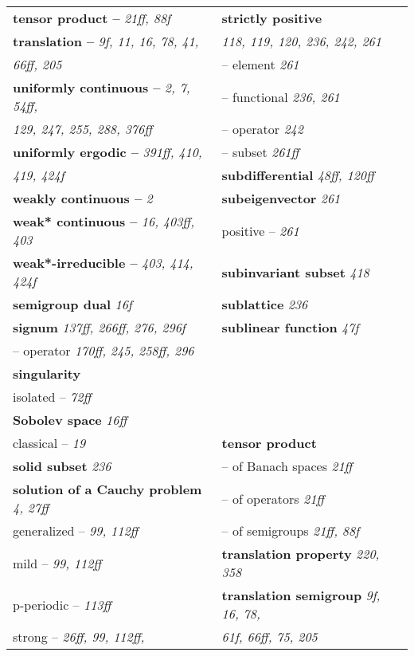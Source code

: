 \begin{longtable}{p{}p{}}
\textbf{tensor product --} \textit{21ff, 88f} & \textbf{strictly positive} \\
\textbf{translation --} \textit{9f, 11, 16, 78, 41,} & \quad \textit{118, 119, 120, 236, 242, 261} \\
\quad \textit{66ff, 205} & \quad -- element \textit{261} \\
\textbf{uniformly continuous --} \textit{2, 7, 54ff,} & \quad -- functional \textit{236, 261} \\
\quad \textit{129, 247, 255, 288, 376ff} & \quad -- operator \textit{242} \\
\textbf{uniformly ergodic --} \textit{391ff, 410,} & \quad -- subset \textit{261ff} \\
\quad \textit{419, 424f} & \textbf{subdifferential} \textit{48ff, 120ff} \\
\textbf{weakly continuous --} \textit{2} & \textbf{subeigenvector} \textit{261} \\
\textbf{weak* continuous --} \textit{16, 403ff, 403} & \quad positive -- \textit{261} \\
\textbf{weak*-irreducible --} \textit{403, 414, 424f} & \textbf{subinvariant subset} \textit{418} \\
\textbf{semigroup dual} \textit{16f} & \textbf{sublattice} \textit{236} \\
\textbf{signum} \textit{137ff, 266ff, 276, 296f} & \textbf{sublinear function} \textit{47f} \\
\quad -- operator \textit{170ff, 245, 258ff, 296} & \\
\textbf{singularity} & \\
\quad isolated -- \textit{72ff} & \\
\textbf{Sobolev space} \textit{16ff} & \\
\quad classical -- \textit{19} & \textbf{tensor product} \\
\textbf{solid subset} \textit{236} & \quad -- of Banach spaces \textit{21ff} \\
\textbf{solution of a Cauchy problem} \textit{4, 27ff} & \quad -- of operators \textit{21ff} \\
\quad generalized -- \textit{99, 112ff} & \quad -- of semigroups \textit{21ff, 88f} \\
\quad mild -- \textit{99, 112ff} & \textbf{translation property} \textit{220, 358} \\
\quad p-periodic -- \textit{113ff} & \textbf{translation semigroup} \textit{9f, 16, 78,} \\
\quad strong -- \textit{26ff, 99, 112ff,} & \quad \textit{61f, 66ff, 75, 205} \\

\end{longtable}
